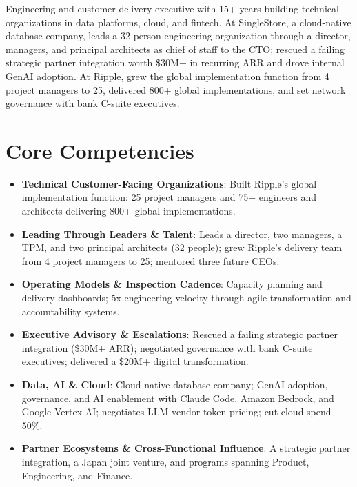 \documentclass[11pt,letterpaper,sans]{moderncv}
\begin{document}
\makecvtitle


\vspace{6pt}
\small{Engineering and customer-delivery executive with 15+ years building technical organizations in data platforms, cloud, and fintech. At SingleStore, a cloud-native database company, leads a 32-person engineering organization through a director, managers, and principal architects as chief of staff to the CTO; rescued a failing strategic partner integration worth \$30M+ in recurring ARR and drove internal GenAI adoption. At Ripple, grew the global implementation function from 4 project managers to 25, delivered 800+ global implementations, and set network governance with bank C-suite executives.}


\section{Core Competencies}
\vspace{1pt}
\begin{itemize}

\item \textbf{Technical Customer-Facing Organizations}: Built Ripple's global implementation function: 25 project managers and 75+ engineers and architects delivering 800+ global implementations.

\item \textbf{Leading Through Leaders \& Talent}: Leads a director, two managers, a TPM, and two principal architects (32 people); grew Ripple's delivery team from 4 project managers to 25; mentored three future CEOs.

\item \textbf{Operating Models \& Inspection Cadence}: Capacity planning and delivery dashboards; 5x engineering velocity through agile transformation and accountability systems.

\item \textbf{Executive Advisory \& Escalations}: Rescued a failing strategic partner integration (\$30M+ ARR); negotiated governance with bank C-suite executives; delivered a \$20M+ digital transformation.

\item \textbf{Data, AI \& Cloud}: Cloud-native database company; GenAI adoption, governance, and AI enablement with Claude Code, Amazon Bedrock, and Google Vertex AI; negotiates LLM vendor token pricing; cut cloud spend 50\%.

\item \textbf{Partner Ecosystems \& Cross-Functional Influence}: A strategic partner integration, a Japan joint venture, and programs spanning Product, Engineering, and Finance.

\end{itemize}
\end{document}
